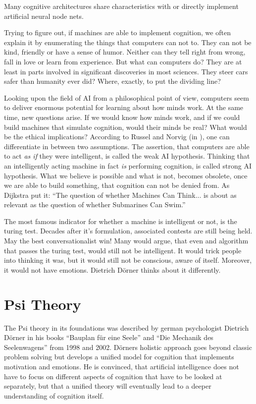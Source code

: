 
Many cognitive architectures share characteristics with or directly implement artificial neural node nets.

Trying to figure out, if machines are able to implement cognition, we often explain it by enumerating the things that computers can not to. They can not be kind, friendly or have a sense of humor. Neither can they tell right from wrong, fall in love or learn from experience. But what can computers do? They are at least in parts involved in significant discoveries in most sciences. They steer cars safer than humanity ever did? Where, exactly, to put the dividing line?~\cite{russell2009artificial}

Looking upon the field of AI from a philosophical point of view, computers seem to deliver enormous potential for learning about how minds work. At the same time, new questions arise. If we would know how minds work, and if we could build machines that simulate cognition, would their minds be real? What would be the ethical implications? According to Russel and Norvig (in \cite{russell2009artificial}), one can differentiate in between two assumptions. The assertion, that computers are able to act \emph{as if} they were intelligent, is called the weak AI hypothesis. Thinking that an intelligently acting machine in fact \emph{is} performing cognition, is called strong AI hypothesis. What we believe is possible and what is not, becomes obsolete, once we are able to build something, that cognition can not be denied from. As Dijkstra put it: ``The question of whether Machines Can Think... is about as relevant as the question of whether Submarines Can Swim.''

The most famous indicator for whether a machine is intelligent or not, is the turing test. Decades after it's formulation, associated contests are still being held. May the best conversationalist win! Many would argue, that even and algorithm that passes the turing test, would still not be intelligent. It would trick people into thinking it was, but it would still not be conscious, aware of itself. Moreover, it would not have emotions. Dietrich Dörner thinks about it differently.~\cite{russell2009artificial}



\cite{russell2009artificial}


\section{Psi Theory}
The Psi theory in its foundations was described by german psychologist Dietrich Dörner in his books ``Bauplan für eine Seele'' and ``Die Mechanik des Seelenwagens'' from 1998 and 2002. Dörners holistic approach goes beyond classic problem solving but develops a unified model for cognition that implements motivation and emotions. He is convinced, that artificial intelligence does not have to focus on different aspects of cognition that have to be looked at separately, but that a unified theory will eventually lead to a deeper understanding of cognition itself.

